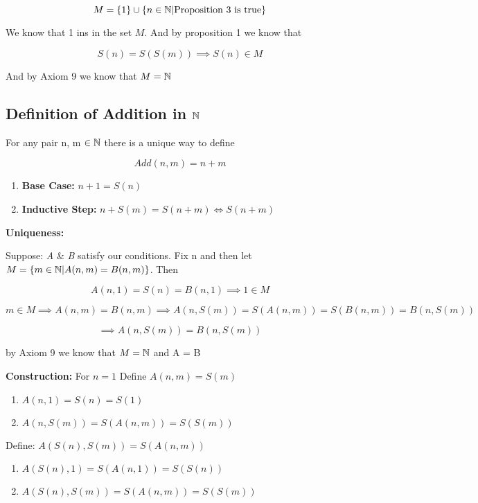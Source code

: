 \[
	M = \{1\} \cup\{n \in \mathbb{N} | \text{Proposition 3 is true}\}
\]

We know that 1 ins in the set \(M\). And by proposition 1 we know that

\[
	S(n) = S(S(m)) \implies S(n) \in M
\]

And by Axiom 9 we know that \(M = \mathbb{N}\)

\subsection{Definition of Addition in \texorpdfstring{\(\mathbb{N}\)}{}}

For any pair n, m \(\in \mathbb{N}\) there is a unique way to define

\[
	Add(n , m) = n + m
\]

\begin{enumerate}
	\item \textbf{Base Case:} \(n + 1 = S(n)\)
	\item \textbf{Inductive Step:} \(n + S(m) = S(n + m) \iff S(n + m)\)
\end{enumerate}

\textbf{Uniqueness:} 
\vspace{\baselineskip}

Suppose: \textit{A} \& \textit{B} satisfy our conditions. Fix n and then let \(M = \{ m \in \mathbb{N} | A(n,m) = B(n, m)\}\). Then

\[
	A(n,1) = S(n) = B(n,1) \implies 1 \in M
\]

\[
	m \in M \implies A(n, m) = B(n, m) \implies A(n, S(m)) = S(A(n, m)) = S(B(n, m)) = B(n, S(m))
\]

\[
	\implies A(n , S(m)) = B(n, S(m))
\]

by Axiom 9 we know that \(M = \mathbb{N}\) and A = B

\textbf{Construction:} For \(n = 1\) Define \(A(n, m) = S(m)\)

\begin{enumerate}
	\item \(A(n, 1) = S(n) = S(1)\)
	\item \(A(n, S(m)) = S(A(n, m)) = S(S(m))\)
\end{enumerate}

Define: \(A(S(n), S(m)) = S(A(n, m))\)

\begin{enumerate}
	\item \(A(S(n), 1) = S(A(n, 1)) = S(S(n))\)
	\item \(A(S(n), S(m)) = S(A(n, m)) = S(S(m))\)
\end{enumerate}

